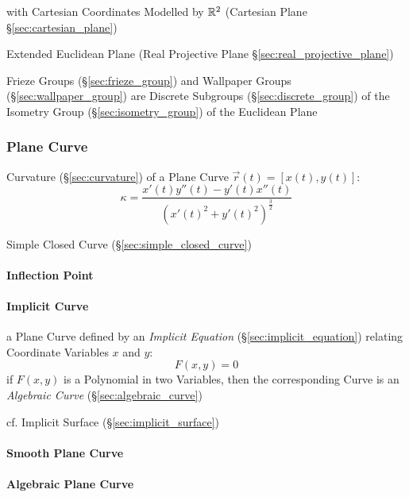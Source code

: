 with Cartesian Coordinates Modelled by $\mathbb{R}^2$ (Cartesian Plane
\S\ref{sec:cartesian_plane})

\fist Extended Euclidean Plane (Real Projective Plane
\S\ref{sec:real_projective_plane})

Frieze Groups (\S\ref{sec:frieze_group}) and Wallpaper Groups
(\S\ref{sec:wallpaper_group}) are Discrete Subgroups
(\S\ref{sec:discrete_group}) of the Isometry Group (\S\ref{sec:isometry_group})
of the Euclidean Plane



\subsubsection{Plane Curve}\label{sec:plane_curve}

Curvature (\S\ref{sec:curvature}) of a Plane Curve $\vec{r}(t) = [x(t),y(t)]$:
\[
  \kappa = \frac{x'(t)y''(t) - y'(t)x''(t)} {(x'(t)^2 + y'(t)^2)^{\frac{3}{2}}}
\]

\fist Simple Closed Curve (\S\ref{sec:simple_closed_curve})



\paragraph{Inflection Point}\label{sec:inflection_point}\hfill

\paragraph{Implicit Curve}\label{sec:implicit_curve}\hfill

a Plane Curve defined by an \emph{Implicit Equation}
(\S\ref{sec:implicit_equation}) relating Coordinate Variables $x$ and $y$:
\[
  F(x,y) = 0
\]
if $F(x,y)$ is a Polynomial in two Variables, then the corresponding Curve is an
\emph{Algebraic Curve} (\S\ref{sec:algebraic_curve})

\fist cf. Implicit Surface (\S\ref{sec:implicit_surface})



\paragraph{Smooth Plane Curve}\label{sec:smooth_plane_curve}\hfill

\paragraph{Algebraic Plane Curve}\label{sec:algebraic_plane_curve}\hfill

